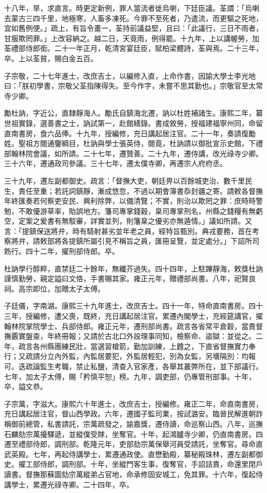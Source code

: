 \begin{pinyinscope}
十八年，旱，求直言。時更定新例，罪人當流者徙烏喇，下廷臣議。荃謂：「烏喇去蒙古三四千里，地極寒，人畜多凍死。今罪不至死者，乃遣流，而更驅之死地，宜如舊例便。」疏上，有旨令畫一，荃持前議益堅，且曰：「此議行，三日不雨者，甘服欺罔罪。」上改容納之。越二日，天竟雨，例得罷。十九年，上以講幄勞，加荃禮部侍郎銜。二十一年正月，乾清宮宴廷臣，賦柏梁體詩，荃與焉。二十三年，卒。上以荃貧，賜白金五百。

子宗敬，二十七年進士，改庶吉士，以編修入直，上命作書，因諭大學士李光地曰：「朕初學書，宗敬父荃指陳得失。至今作字，未嘗不思其勤也。」宗敬官至太常寺少卿。

勵杜訥，字近公，直隸靜海人。勵氏自鎮海北遷，訥以杜姓補諸生。康熙二年，纂世祖實錄，選善書之士，訥試第一，赴館繕錄。書成敘勞，授福建福寧州同，命留直南書房，食六品俸。十九年，授編修，充日講起居注官。二十一年，奏請復勵姓。聖祖方閱通鑒綱目，杜訥與學士張英侍，閱竟，杜訥請以御批宣示史館，下禮部翰林院會議，如所請。二十七年，遷贊善。二十九年，遷侍講，改光祿寺少卿。三十六年，遷通政司參議。三十七年，遷太僕寺卿，再遷宗人府府丞。

三十九年，遷左副都御史。疏言：「督撫大吏，朝廷畀以百餘城吏治、數千里民生，責任至重；若託詞鎮靜，漸成悠忽，不過以期會簿書忝封疆之寄。請敕各督撫年終匯奏若何察吏安民、興利除弊，以備清覽；不實，則治以欺罔之罪：庶時時警勉，不敢優游草率，貽誤地方。籓司專掌錢穀，臬司專掌刑名，州縣之錢糧有無虧空，定案之爰書有無駁審，詳實並列，則籓臬之優劣亦無遁情。」議如所請。又言：「提鎮保送將弁，時有騎射甚劣並年老之員，經特旨甄別。典戎要務，首在考察將弁，請敕部將各提鎮所屬引見不稱旨之員，匯冊呈覽，並定處分。」下詔所司飭行。四十二年，擢刑部侍郎。卒。

杜訥學行醇粹，直禁廷二十餘年，無纖芥過失。四十四年，上駐蹕靜海，敕獎杜訥謹慎勤勞，親定謚曰文恪，手書賜其家。雍正元年，贈禮部尚書。八年，祀賢良祠。高宗即位，加贈太子太傅。

子廷儀，字南湖。康熙三十九年進士，改庶吉士。四十一年，特命直南書房。四十三年，授編修，遭父喪，既終，充日講起居注官。累遷內閣學士，充經筵講官，擢翰林院掌院學士、兵部侍郎。雍正元年，遷刑部尚書。疏言各省常平倉穀，當責督撫覈實盤查，年終冊報；又請於古北口外設理事同知，檢察命、盜獄：並從之。二年，疏言各州縣團練民壯，當選習槍箭，勤加訓練，上韙之，下直省督撫實力奉行；又疏請分立內外監，內監居要犯，外監居輕犯，別為女監，另墻隔別：均報可。迭疏論監生考職，禁止私鹽，清查入官家產，各舉其叢弊所在，並下部議行。七年，加太子太傅，賜「矜慎平恕」榜。九年，調吏部，仍專管刑部事。十年，卒，謚文恭。

子宗萬，字滋大。康熙六十年進士，改庶吉士，授編修。雍正二年，命直南書房，充日講起居注官，督山西學政。六年，遷國子監司業，按試潞安。臨晉民解進朝詐稱御前總管，私書請託，宗萬疏發之，諭嘉獎，遷侍讀，命巡察山西。八年，巡撫石麟劾宗萬擾驛遞，並縱僕受賕，坐奪官。十年，起鴻臚寺少卿，仍直南書房。四遷至禮部侍郎，調刑部。乾隆元年，吏部劾宗萬保舉河員受請託，坐奪官。尋命直武英殿。七年，再起侍講學士，累遷通政使。直懋勤殿，纂秘殿珠林，遷左副都御史。擢工部侍郎，調刑部。十年，坐縱門客生事，復奪官，手詔詰責，命還里閉戶讀書。督撫那蘇圖劾宗萬縱弟占官地，命承修固安城工，免其罪。十六年，復起侍講學士，累遷光祿寺卿。二十四年，卒。


\end{pinyinscope}
